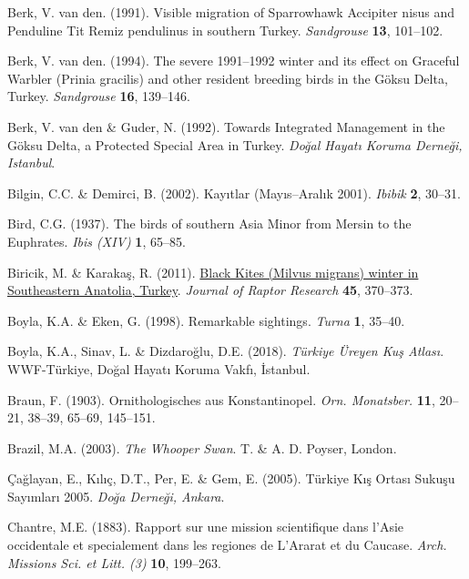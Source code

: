 \documentclass[
  a4paper,
  DIV=11,
  numbers=noendperiod]{scrreprt}
\newlength{\cslhangindent}
\newenvironment{CSLReferences}[2] %
 {\begin{list}{}{%
  \setlength{\itemindent}{0pt}
  \setlength{\leftmargin}{0pt}
  \setlength{\parsep}{0pt}
  \ifodd #1
   \setlength{\leftmargin}{\cslhangindent}
   \setlength{\itemindent}{-1\cslhangindent}
  \fi
  \setlength{\itemsep}{#2\baselineskip}}}
 {\end{list}}
\begin{document}
\begin{CSLReferences}{1}{1}
Berk, V. van den. (1991). {Visible migration of Sparrowhawk {Accipiter
nisus} and Penduline Tit {Remiz pendulinus} in southern Turkey}.
\emph{Sandgrouse} \textbf{13}, 101--102.

Berk, V. van den. (1994). {The severe 1991--1992 winter and its effect
on Graceful Warbler ({Prinia gracilis}) and other resident breeding
birds in the Göksu Delta, Turkey}. \emph{Sandgrouse} \textbf{16},
139--146.

Berk, V. van den \& Guder, N. (1992). {Towards Integrated Management in
the Göksu Delta, a Protected Special Area in Turkey}. \emph{Doğal Hayatı
Koruma Derneği, Istanbul}.

Bilgin, C.C. \& Demirci, B. (2002). {Kayıtlar (Mayıs--Aralık 2001)}.
\emph{Ibibik} \textbf{2}, 30--31.

Bird, C.G. (1937). {The birds of southern Asia Minor from Mersin to the
Euphrates}. \emph{Ibis (XIV)} \textbf{1}, 65--85.

Biricik, M. \& Karakaş, R. (2011).
\href{https://doi.org/10.3356/JRR-10-109.1}{{Black Kites (Milvus
migrans) winter in Southeastern Anatolia, Turkey}}. \emph{Journal of
Raptor Research} \textbf{45}, 370--373.

Boyla, K.A. \& Eken, G. (1998). {Remarkable sightings}. \emph{Turna}
\textbf{1}, 35--40.

Boyla, K.A., Sinav, L. \& Dizdaroğlu, D.E. (2018). \emph{{Türkiye Üreyen
Kuş Atlası}}. WWF-Türkiye, Doğal Hayatı Koruma Vakfı, İstanbul.

Braun, F. (1903). {Ornithologisches aus Konstantinopel}. \emph{Orn.
Monatsber.} \textbf{11}, 20--21, 38--39, 65--69, 145--151.

Brazil, M.A. (2003). \emph{{The Whooper Swan}}. T. \& A. D. Poyser,
London.

Çağlayan, E., Kılıç, D.T., Per, E. \& Gem, E. (2005). {Türkiye Kış
Ortası Sukuşu Sayımları 2005}. \emph{Doğa Derneği, Ankara}.

Chantre, M.E. (1883). {Rapport sur une mission scientifique dans l'Asie
occidentale et specialement dans les regiones de L'Ararat et du
Caucase}. \emph{Arch. Missions Sci. et Litt. (3)} \textbf{10}, 199--263.


\end{CSLReferences}
\end{document}
